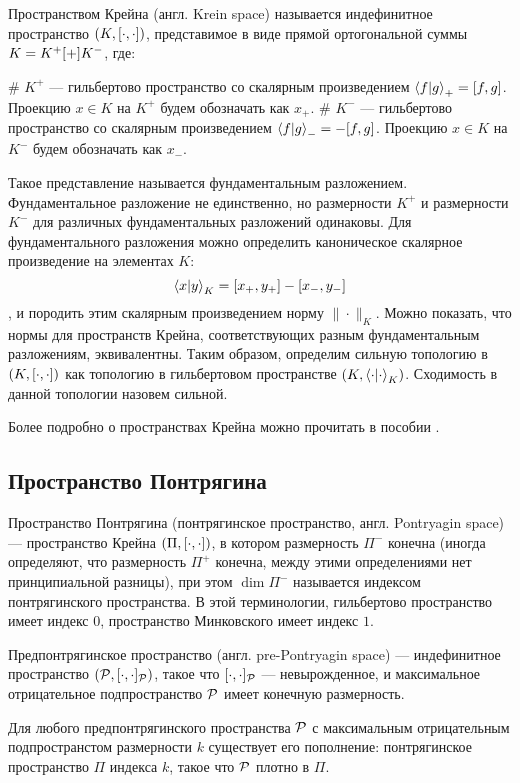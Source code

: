 Пространством Крейна (англ. Krein space) называется индефинитное пространство $(K, [\cdot,\cdot])$, представимое в виде прямой ортогональной суммы $K = K^+ [+] K^-$, где:
\begin{ilist}
# $K^+$ — гильбертово пространство со скалярным произведением $\ip{f}{g}_+ = \iip{f}{g}$. Проекцию $x \in K$ на $K^+$ будем обозначать как $x_+$.
# $K^-$ — гильбертово пространство со скалярным произведением $\ip{f}{g}_- = -\iip{f}{g}$. Проекцию $x \in K$ на $K^-$ будем обозначать как $x_-$.
\end{ilist}
Такое представление называется фундаментальным разложением. Фундаментальное разложение не единственно, но размерности $K^+$ и размерности $K^-$ для различных фундаментальных разложений одинаковы. Для фундаментального разложения можно определить каноническое скалярное произведение на элементах $K$:
\[
\ip{x}{y}_K = \iip{x_+}{y_+} - \iip{x_-}{y_-}
\]
, и породить этим скалярным произведением норму $\|\cdot\|_K$. Можно показать, что нормы для пространств Крейна, соответствующих разным фундаментальным разложениям, эквивалентны. Таким образом, определим сильную топологию в $(K, [\cdot,\cdot])$ как топологию в гильбертовом пространстве $(K, \ipcdot_K)$. Сходимость в данной топологии назовем сильной.

Более подробно о пространствах Крейна можно прочитать в пособии \cite{azizov_krein}.
\subsection{Пространство Понтрягина}
Пространство Понтрягина (понтрягинское пространство, англ. Pontryagin space) — пространство Крейна $(\Pi, [\cdot,\cdot])$, в котором размерность $\Pi^-$ конечна (иногда определяют, что размерность $\Pi^+$ конечна, между этими определениями нет принципиальной разницы), при этом $\dim \Pi^-$ называется индексом понтрягинского пространства. В этой терминологии, гильбертово пространство имеет индекс $0$, пространство Минковского имеет индекс $1$.

Предпонтрягинское пространство (англ. pre-Pontryagin space) — индефинитное пространство $(\mathcal{P}, [\cdot,\cdot]_{\mathcal{P}})$, такое что $[\cdot,\cdot]_{\mathcal{P}}$ — невырожденное, и максимальное отрицательное подпространство $\mathcal{P}$ имеет конечную размерность.

Для любого предпонтрягинского пространства $\mathcal{P}$ с максимальным отрицательным подпространстом размерности $k$ существует его пополнение: понтрягинское пространство $\Pi$ индекса $k$, такое что $\mathcal{P}$ плотно в $\Pi$.

